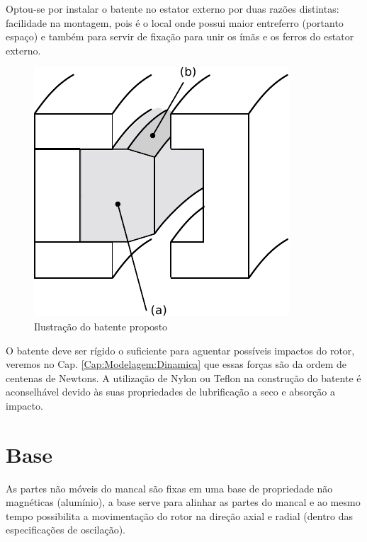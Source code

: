 Optou-se por instalar o batente no estator externo por duas razões distintas: facilidade na montagem, pois  é o local onde possui maior entreferro (portanto espaço) e também para servir de fixação para unir os ímãs e os ferros do estator externo. 

\begin{figure}[th!]
\centering
\includegraphics[width=0.4\linewidth]{./Figs/mancais/mancal_batente_corte}
\caption{Ilustração do batente proposto}
\label{fig:mancal:batente:corte}
\end{figure}


O batente deve ser rígido o suficiente para aguentar possíveis impactos do rotor, veremos no Cap. \ref{Cap:Modelagem:Dinamica} que essas forças são da ordem de centenas de Newtons. A utilização de Nylon ou Teflon na construção do batente é aconselhável \citep[Cap. 13]{Schweitzer2009} devido às suas propriedades de lubrificação a seco e absorção a impacto.

\section{Base}

As partes não móveis do mancal são fixas em uma base de propriedade não magnéticas (alumínio), a base serve para alinhar as partes do mancal e ao mesmo tempo possibilita a movimentação do rotor na direção axial e radial (dentro das especificações de oscilação). 

%


